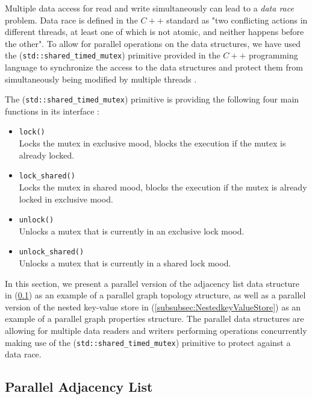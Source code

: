 {Multiple data access for read and write simultaneously can lead to a \textit{data race} problem. Data race is defined in the $C++$ standard as "two conflicting actions in different threads, at least one of which is not atomic, and neither happens before the other". To allow for parallel operations on the data structures, we have used the (\texttt{std::shared\_timed\_mutex}) primitive provided in the $C++$ programming language to synchronize the access to the data structures and protect them from simultaneously being modified by multiple threads \cite{josuttis2012c++}.

The (\texttt{std::shared\_timed\_mutex}) primitive is providing the following four main functions in its interface \cite{josuttis2012c++}:
\begin{itemize}  

\item{\texttt{lock()}}\\
Locks the mutex in exclusive mood, blocks the execution if the mutex is already locked.

\item{\texttt{lock\_shared()}}\\
Locks the mutex in shared mood, blocks the execution if the mutex is already locked in exclusive mood.

\item{\texttt{unlock()}}\\
Unlocks a mutex that is currently in an exclusive lock mood.

\item{\texttt{unlock\_shared()}}\\
Unlocks a mutex that is currently in a shared lock mood.

\end{itemize}

In this section, we present a parallel version of the adjacency list data structure in (\ref{subsec:PhyDesign-ParallelAdjacencyList}) as an example of a parallel graph topology structure, as well as a parallel version of the nested key-value store in (\ref{subsubsec:NestedkeyValueStore}) as an example of a parallel graph properties structure. The parallel data structures are allowing for multiple data readers and writers performing operations concurrently making use of the (\texttt{std::shared\_timed\_mutex}) primitive to protect against a data race.



\subsection{Parallel Adjacency List}
\label{subsec:PhyDesign-ParallelAdjacencyList}

}
